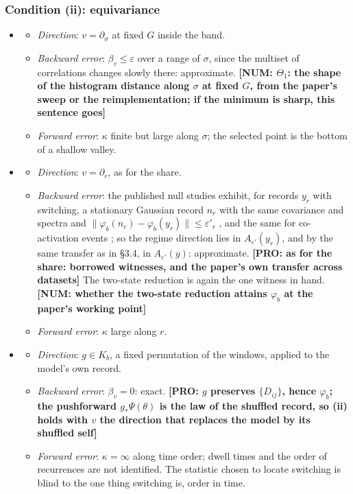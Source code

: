 \documentclass[11pt]{article}
\newcommand{\NUM}[1]{\textcolor{red!70!black}{\textbf{[NUM: #1]}}}
\newcommand{\PRO}[1]{\textcolor{blue!55!black}{\textbf{[PRO: #1]}}}
\begin{document}
\subsubsection{Condition (ii): equivariance}
\begin{itemize}
\item[$\Theta_1$]
  \begin{itemize}
  \item \emph{Direction}: $v=\partial_\sigma$ at fixed $G$ inside the band.
  \item \emph{Backward error}: $\beta_v\le\varepsilon$ over a range of $\sigma$, since the multiset of correlations changes slowly there: approximate. \NUM{$\Theta_1$: the shape of the histogram distance along $\sigma$ at fixed $G$, from the paper's sweep or the reimplementation; if the minimum is sharp, this sentence goes}
  \item \emph{Forward error}: $\kappa$ finite but large along $\sigma$; the selected point is the bottom of a shallow valley.
  \end{itemize}
\item[$\Theta_2$]
  \begin{itemize}
  \item \emph{Direction}: $v=\partial_r$, as for the share.
  \item \emph{Backward error}: the published null studies exhibit, for records $y_r$ with switching, a stationary Gaussian record $n_r$ with the same covariance and spectra and $\|\varphi_b(n_r)-\varphi_b(y_r)\|\le\varepsilon'_r$ \parencite{hindriks2016,liegeois2017,laumann2017}, and the same for co-activation events \parencite{novelli2022}; so the regime direction lies in $A_{\varepsilon'}(y_r)$, and by the same transfer as in \S3.4, in $A_{\varepsilon'}(y)$: approximate. \PRO{as for the share: borrowed witnesses, and the paper's own transfer across datasets} The two-state reduction is again the one witness in hand. \NUM{whether the two-state reduction attains $\varphi_b$ at the paper's working point}
  \item \emph{Forward error}: $\kappa$ large along $r$.
  \end{itemize}
\item[$\Theta_3$]
  \begin{itemize}
  \item \emph{Direction}: $g\in K_b$, a fixed permutation of the windows, applied to the model's own record.
  \item \emph{Backward error}: $\beta_v=0$: exact. \PRO{$g$ preserves $\{D_{ij}\}$, hence $\varphi_b$; the pushforward $g_*\Psi(\theta)$ is the law of the shuffled record, so (ii) holds with $v$ the direction that replaces the model by its shuffled self}
  \item \emph{Forward error}: $\kappa=\infty$ along time order; dwell times and the order of recurrences are not identified. The statistic chosen to locate switching is blind to the one thing switching is, order in time.
  \end{itemize}
\end{itemize}
\end{document}
